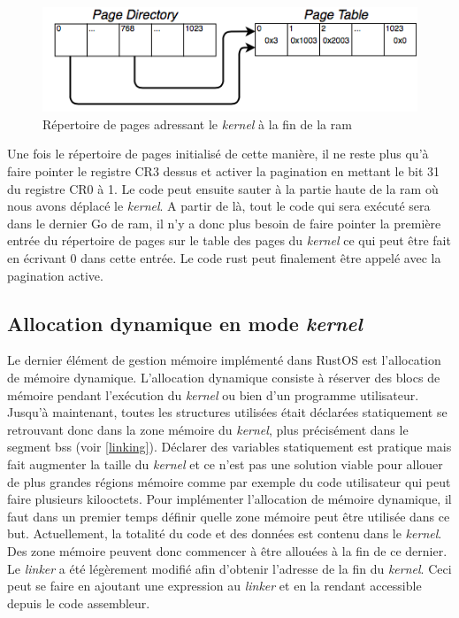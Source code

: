 \begin{figure}[!h]
  \centering
  \includegraphics[scale=0.65]{images/high_kern_pd.png}
  \caption{Répertoire de pages adressant le \textit{kernel} à la fin de la \acrshort{ram}}
  \label{high_kern_pd}
\end{figure}

Une fois le répertoire de pages initialisé de cette manière, il ne reste plus
qu'à faire pointer le registre CR3 dessus et activer la pagination en mettant
le bit 31 du registre CR0 à 1. Le code peut ensuite sauter à la partie haute de
la \acrshort{ram} où nous avons déplacé le \textit{kernel}. A partir de là,
tout le code qui sera exécuté sera dans le dernier Go de \acrshort{ram}, il n'y
a donc plus besoin de faire pointer la première entrée du répertoire de pages
sur le table des pages du \textit{kernel} ce qui peut être fait en écrivant 0
dans cette entrée. Le code rust peut finalement être appelé avec la pagination
active.


\subsection{Allocation dynamique en mode \textit{kernel}}
\label{alloc_kernel}
Le dernier élément de gestion mémoire implémenté dans RustOS est l'allocation de
mémoire dynamique. L'allocation dynamique consiste à réserver des blocs de mémoire
pendant l'exécution du \textit{kernel} ou bien d'un programme utilisateur. Jusqu'à
maintenant, toutes les structures utilisées était déclarées statiquement se retrouvant
donc dans la zone mémoire du \textit{kernel}, plus précisément dans le segment
bss (voir \ref{linking}). Déclarer des variables statiquement est pratique mais fait
augmenter la taille du \textit{kernel} et ce n'est pas une solution viable
pour allouer de plus grandes régions mémoire comme par exemple du code utilisateur
qui peut faire plusieurs kilooctets. Pour implémenter l'allocation de mémoire
dynamique, il faut dans un premier temps définir quelle zone mémoire peut être
utilisée dans ce but. Actuellement, la totalité du code et des données est contenu
dans le \textit{kernel}. Des zone mémoire peuvent donc commencer à être allouées
à la fin de ce dernier. Le \textit{linker} a été légèrement modifié afin d'obtenir
l'adresse de la fin du \textit{kernel}. Ceci peut se faire en ajoutant une expression
au \textit{linker} et en la rendant accessible depuis le code assembleur. \\

